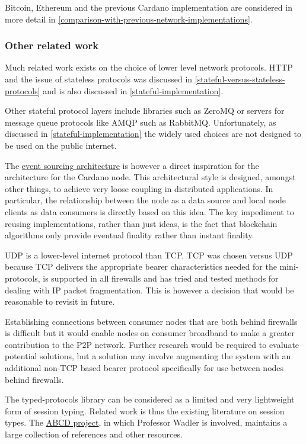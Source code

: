 \documentclass[11pt,a4paper]{article}
\begin{document}
Bitcoin, Ethereum and the previous Cardano implementation are considered
in more detail in
\cref{comparison-with-previous-network-implementations}.

\subsubsection{Other related work}
\label{other-related-work}

Much related work exists on the choice of lower level network protocols.
HTTP and the issue of stateless protocols was discussed in
\cref{stateful-versus-stateless-protocols}
and is also discussed in
\cref{stateful-implementation}.

Other stateful protocol layers include libraries such as ZeroMQ or
servers for message queue protocols like AMQP such as RabbitMQ.
Unfortunately, as discussed in
\cref{stateful-implementation} the widely
used choices are not designed to be used on the public internet.

The \href{https://martinfowler.com/eaaDev/EventSourcing.html}{{event
sourcing architecture}} is however a direct inspiration for the
architecture for the Cardano node. This architectural style is designed,
amongst other things, to achieve very loose coupling in distributed
applications. In particular, the relationship between the node as a data
source and local node clients as data consumers is directly based on
this idea. The key impediment to reusing implementations, rather than
just ideas, is the fact that blockchain algorithms only provide eventual
finality rather than instant finality.

UDP is a lower-level internet protocol than TCP. TCP was chosen versus
UDP because TCP delivers the appropriate bearer characteristics needed
for the mini-protocols, is supported in all firewalls and has tried and
tested methods for dealing with IP packet fragmentation. This is however
a decision that would be reasonable to revisit in future.

Establishing connections between consumer nodes that are both behind
firewalls is difficult but it would enable nodes on consumer broadband
to make a greater contribution to the P2P network. Further research
would be required to evaluate potential solutions, but a solution may
involve augmenting the system with an additional non-TCP based bearer
protocol specifically for use between nodes behind firewalls.

The typed-protocols library can be considered as a limited and very
lightweight form of session typing. Related work is thus the existing
literature on session types. The
\href{https://groups.inf.ed.ac.uk/abcd/}{{ABCD project}}, in which
Professor Wadler is involved, maintains a large collection of references
and other resources.
\end{document}
